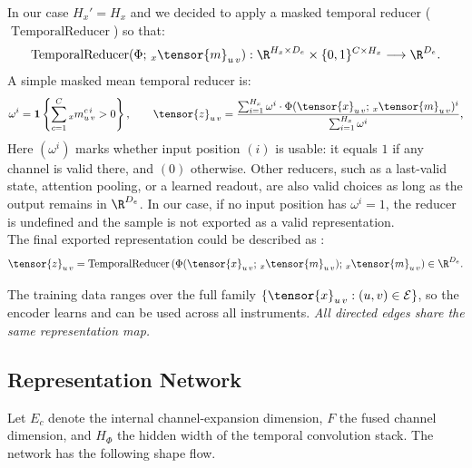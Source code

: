 In our case $H_x' = H_x$ and we decided to apply a masked temporal reducer ($\operatorname{TemporalReducer}$) so that:
\[
  \operatorname{TemporalReducer}(\Phi;\,{}_{x}\tensor{m}_{u\,v}) :
  \R^{H_x \times D_e}
  \times
  \{0,1\}^{C \times H_x}
  \longrightarrow
  \R^{D_e}.
\]
A simple masked mean temporal reducer is:
\begin{equation}
\label{eq:masked-mean-reducer}
  \omega^i
  =
  \mathbf{1}
  \left\{
    \sum_{c=1}^{C} {}_{x}m_{u\,v}^{c\,i} > 0
  \right\},
  \qquad
  \tensor{z}_{u\,v}
  =
  \frac{
    \sum_{i=1}^{H_x}
    \omega^i\cdot
    \Phi(\tensor{x}_{u\,v};\,{}_{x}\tensor{m}_{u\,v})^{i}
  }{
    \sum_{i=1}^{H_x} \omega^i
  },
\end{equation}
Here $(\omega^i)$ marks whether input position $(i)$ is usable: it equals $1$
if any channel is valid there, and $(0)$ otherwise. Other reducers, such as a last-valid
state, attention pooling, or a learned readout, are also valid choices as long
as the output remains in $\R^{D_e}$. In our case, if no input position has $\omega^i=1$,
the reducer is undefined and the sample is not exported as a valid representation.\\

The final exported representation could be described as%
: 
\[
  \tensor{z}_{u\,v}
  =
  \operatorname{TemporalReducer}
  \left(
    \Phi(\tensor{x}_{u\,v};\,{}_{x}\tensor{m}_{u\,v});\,
    {}_{x}\tensor{m}_{u\,v}
  \right)
  \in
  \R^{D_e}.
\]

The training data ranges
over the full family $\{\tensor{x}_{u\,v} : (u,v)\in\mathcal{E}\}$, so the
encoder learns and can be used across all instruments. 
\textit{All directed edges share the same representation map.}












\subsection{Representation Network}
\label{subsec:network-structure}

Let $E_c$ denote the internal channel-expansion dimension, $F$ the fused channel
dimension, and $H_{\Phi}$ the hidden width of the temporal convolution stack.  The
network has the following shape flow.

